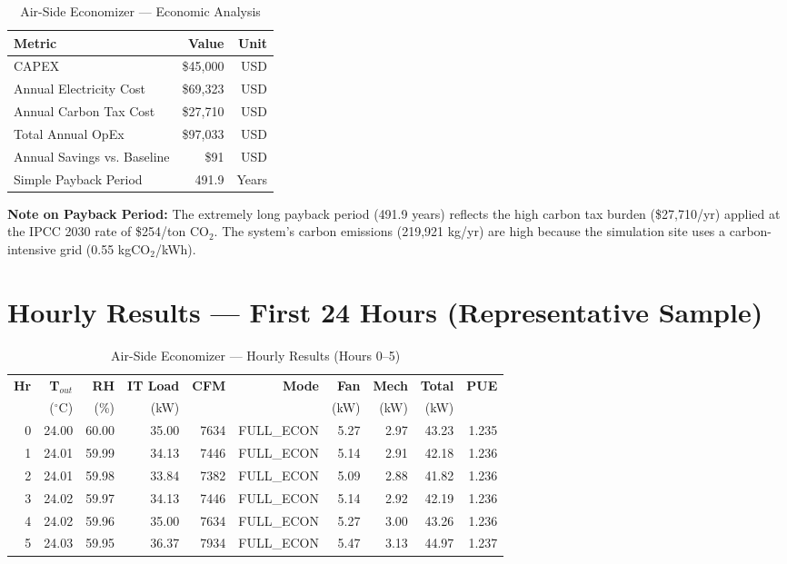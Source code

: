 \documentclass[12pt,a4paper]{report}
\newcommand{\degC}{$^{\circ}$C}
\begin{document}
\begin{table}[H]
\centering
\caption{Air-Side Economizer --- Economic Analysis}
\label{tab:air_econ}
\renewcommand{\arraystretch}{1.3}
\begin{tabular}{lrr}
\toprule
\textbf{Metric} & \textbf{Value} & \textbf{Unit} \\
\midrule
CAPEX & \$45{,}000 & USD \\
Annual Electricity Cost & \$69{,}323 & USD \\
Annual Carbon Tax Cost & \$27{,}710 & USD \\
Total Annual OpEx & \$97{,}033 & USD \\
Annual Savings vs. Baseline & \$91 & USD \\
Simple Payback Period & 491.9 & Years \\
\bottomrule
\end{tabular}
\end{table}

\noindent\textbf{Note on Payback Period:} The extremely long payback period (491.9 years) reflects
the high carbon tax burden (\$27{,}710/yr) applied at the IPCC 2030 rate of \$254/ton CO$_2$.
The system's carbon emissions (219{,}921 kg/yr) are high because the simulation site uses a
carbon-intensive grid (0.55 kgCO$_2$/kWh).

\section{Hourly Results --- First 24 Hours (Representative Sample)}

\begin{table}[H]
\centering
\caption{Air-Side Economizer --- Hourly Results (Hours 0--5)}
\label{tab:air_hourly}
\renewcommand{\arraystretch}{1.2}
\scriptsize
\begin{tabular}{rrrrrrrrrr}
\toprule
\textbf{Hr} & \textbf{T$_{out}$} & \textbf{RH} & \textbf{IT Load} & \textbf{CFM} & \textbf{Mode} & \textbf{Fan} & \textbf{Mech} & \textbf{Total} & \textbf{PUE} \\
 & (\degC) & (\%) & (kW) & & & (kW) & (kW) & (kW) & \\
\midrule
0 & 24.00 & 60.00 & 35.00 & 7634 & FULL\_ECON & 5.27 & 2.97 & 43.23 & 1.235 \\
1 & 24.01 & 59.99 & 34.13 & 7446 & FULL\_ECON & 5.14 & 2.91 & 42.18 & 1.236 \\
2 & 24.01 & 59.98 & 33.84 & 7382 & FULL\_ECON & 5.09 & 2.88 & 41.82 & 1.236 \\
3 & 24.02 & 59.97 & 34.13 & 7446 & FULL\_ECON & 5.14 & 2.92 & 42.19 & 1.236 \\
4 & 24.02 & 59.96 & 35.00 & 7634 & FULL\_ECON & 5.27 & 3.00 & 43.26 & 1.236 \\
5 & 24.03 & 59.95 & 36.37 & 7934 & FULL\_ECON & 5.47 & 3.13 & 44.97 & 1.237 \\
\bottomrule
\end{tabular}
\end{table}
\end{document}
